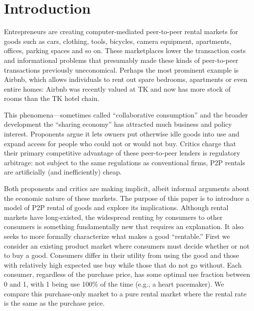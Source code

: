 \documentclass[11pt]{article}
\begin{document}




\section{Introduction}
Entrepreneurs are creating computer-mediated peer-to-peer rental markets for goods such as cars, clothing, tools, bicycles, camera equipment, apartments, offices, parking spaces and so on.
These marketplaces lower the transaction costs and informational problems that presumably made these kinds of peer-to-peer transactions previously uneconomical.
Perhaps the most prominent example is Airbnb, which allows individuals to rent out spare bedrooms, apartments or even entire homes: Airbnb was recently valued at TK and now has more stock of rooms than the TK hotel chain. 
 
This phenomena---sometimes called ``collaborative consumption'' and the broader development the ``sharing economy'' has attracted much business and policy interest.  
Proponents argue it lets owners put otherwise idle goods into use and expand access for people who could not or would not buy. 
Critics charge that their primary competitive advantage of these peer-to-peer lenders is regulatory arbitrage: 
not subject to the same regulations as conventional firms, P2P rentals are artificially (and inefficiently) cheap. 

Both proponents and critics are making implicit, albeit informal arguments about the economic nature of these markets.  
The purpose of this paper is to introduce a model of P2P rental of goods and explore its implications.  
Although rental markets have long-existed, the widespread renting by consumers to other consumers is something fundamentally new that requires an explanation.  
It also seeks to more formally characterize what makes a good ``rentable.'' 
First we consider an existing product market where consumers must decide whether or not to buy a good.
Consumers differ in their utility from using the good and those with relatively high expected use buy while those that do not go without.
Each consumer, regardless of the purchase price, has some optimal use fraction between 0 and 1, with 1 being use 100\% of the time (e.g., a heart pacemaker). 
We compare this purchase-only market to a pure rental market where the rental rate is the same as the purchase price. 
\end{document}
